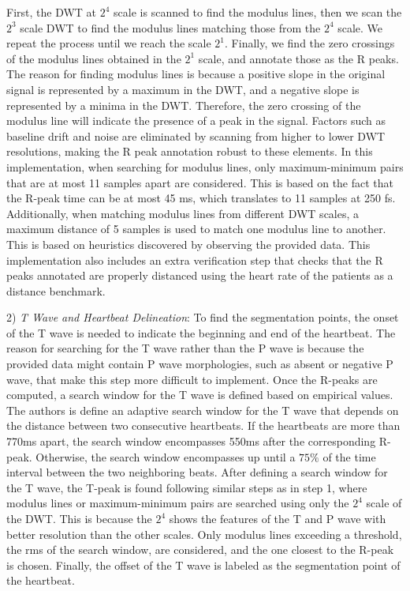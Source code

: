\documentclass[conference,compsoc]{IEEEtran}
\begin{document}
First, the DWT at $2^4$ scale is scanned to find the modulus lines, then we scan the $2^3$ scale DWT to find the modulus lines matching those from the $2^4$ scale. We repeat the process until we reach the scale $2^1$. Finally, we find the zero crossings of the modulus lines obtained in the $2^1$ scale, and annotate those as the R peaks. The reason for finding modulus lines is because a positive slope in the original signal is represented by a maximum in the DWT, and a negative slope is represented by a minima in the DWT. Therefore, the zero crossing of the modulus line will indicate the presence of a peak in the signal. Factors such as baseline drift and noise are eliminated by scanning from higher to lower DWT resolutions, making the R peak annotation robust to these elements. In this implementation, when searching for modulus lines, only maximum-minimum pairs that are at most 11 samples apart are considered. This is based on the fact that the R-peak time can be at most 45 ms, which translates to 11 samples at 250 fs. Additionally, when matching modulus lines from different DWT scales, a maximum distance of 5 samples is used to match one modulus line to another. This is based on heuristics discovered by observing the provided data. This implementation also includes an extra verification step that checks that the R peaks annotated are properly distanced using the heart rate of the patients as a distance benchmark.

2) \textit{T Wave and Heartbeat Delineation}: To find the segmentation points, the onset of the T wave is needed to indicate the beginning and end of the heartbeat. The reason for searching for the T wave rather than the P wave is because the provided data might contain P wave morphologies, such as absent or negative P wave, that make this step more difficult to implement. Once the R-peaks are computed, a search window for the T wave is defined based on empirical values. The authors is \cite{ChenGenlang2020ACWD} define an adaptive search window for the T wave that depends on the distance between two consecutive heartbeats. If the heartbeats are more than 770ms apart, the search window encompasses 550ms after the corresponding R-peak. Otherwise, the search window encompasses up until a $75\%$ of the time interval between the two neighboring beats. After defining a search window for the T wave, the T-peak is found following similar steps as in step 1, where modulus lines or maximum-minimum pairs are searched using only the $2^4$ scale of the DWT. This is because the $2^4$ shows the features of the T and P wave with better resolution than the other scales. Only modulus lines exceeding a threshold, the rms of the search window, are considered, and the one closest to the R-peak is chosen. Finally, the offset of the T wave is labeled as the segmentation point of the heartbeat.
\end{document}
